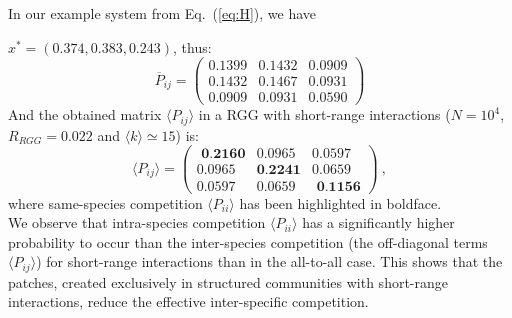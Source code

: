 In our example system from Eq.~(\ref{eq:H}), we have

$x^*=(0.374, 0.383, 0.243)$, thus:
 \begin{equation}
\overline{P}_{ij} =
\begin{pmatrix}
0.1399 & 0.1432 & 0.0909\\
0.1432 & 0.1467 & 0.0931\\
0.0909 & 0.0931 & 0.0590
\end{pmatrix} 
\label{eq:mata2a}
\end{equation}
And the obtained matrix $\langle P_{ij} \rangle$ in a RGG with short-range interactions ($N = 10^4$, $R_{RGG} = 0.022$ and $\langle k \rangle \simeq 15$) is:
\begin{equation}
\langle P_{ij} \rangle =
\begin{pmatrix}
\textbf{ 0.2160} & 0.0965 & 0.0597\\
 0.0965 & \textbf{0.2241} & 0.0659\\
 0.0597 & 0.0659  & \textbf{ 0.1156}
\end{pmatrix} \ ,
\label{eq:matshort}
\end{equation}
where same-species competition $\langle P_{ii} \rangle$ has been highlighted in boldface. \\

We observe that intra-species competition $\langle P_{ii} \rangle$  has a significantly higher probability to occur than the inter-species competition (the off-diagonal terms $\langle P_{ij} \rangle$) for short-range interactions than in the all-to-all case. This shows that the patches, created exclusively in structured communities with short-range interactions, reduce the effective inter-specific competition.  \\

